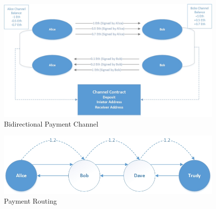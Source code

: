 \begin{figure}[h]
	\centering
    \includegraphics[width=120mm,scale=1]{figs/RPC}
	\caption{Bidirectional Payment Channel}
	\label{fig:RPC}
\end{figure}
\clearpage
\begin{figure}[h]
	\centering
    \includegraphics[width=120mm,scale=1]{figs/PaymentRouting}
	\caption{Payment Routing}
	\label{fig:PaymentRouting}
\end{figure}

